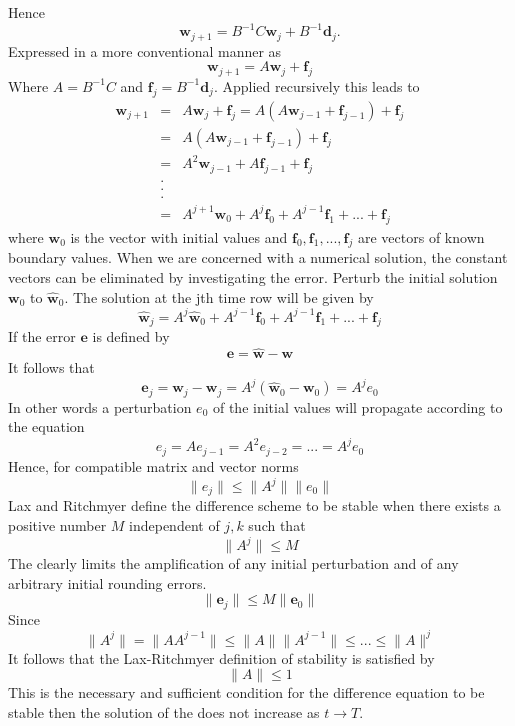 Hence
\[ \mathbf{w}_{j+1}=B^{-1}C\mathbf{w}_j+B^{-1}\mathbf{d}_j. \]
Expressed in a more conventional manner as
\[ \mathbf{w}_{j+1}=A\mathbf{w}_j+\mathbf{f}_j \]
Where $A=B^{-1}C$ and $\mathbf{f}_j =B^{-1}\mathbf{d}_j$.  Applied recursively this leads to
\begin{eqnarray*}
 \mathbf{w}_{j+1}&=&A\mathbf{w}_j+\mathbf{f}_j =A(A\mathbf{w}_{j-1}+\mathbf{f}_{j-1}) +\mathbf{f}_j \\
&=&A(A\mathbf{w}_{j-1}+\mathbf{f}_{j-1}) +\mathbf{f}_j \\
&=&A^2\mathbf{w}_{j-1}+A\mathbf{f}_{j-1} +\mathbf{f}_j \\
&.&\\
&.&\\
&.&\\
&=&A^{j+1}\mathbf{w}_0+A^j\mathbf{f}_0+A^{j-1}\mathbf{f}_1+...+\mathbf{f}_{j}
\end{eqnarray*}
where $\mathbf{w}_0$ is the vector with initial values and $\mathbf{f}_0,\mathbf{f}_1,...,\mathbf{f}_{j}$ are vectors of known boundary values.  When we are concerned with a numerical solution, the constant vectors can be eliminated by investigating the error.  Perturb the initial solution $\mathbf{w}_0$ to $\mathbf{\hat{w}}_0$.  The solution at the jth time row will be given by
\[\mathbf{\hat{w}}_j=A^{j}\mathbf{\hat{w}}_0+A^{j-1}\mathbf{f}_0+A^{j-1}\mathbf{f}_1+...+\mathbf{f}_{j}
\]
If the error $\mathbf{e}$ is defined by 
\[ \mathbf{e}=\mathbf{\hat{w}}-\mathbf{w}\]
It follows that 
\[ \mathbf{e}_j=\mathbf{\hat{w}}_j-\mathbf{w}_j=A^{j}(\mathbf{\hat{w}}_0-\mathbf{w}_0)=A^{j}e_0\]
In other words a perturbation $e_0$ of the initial values will propagate according to the equation 
\[e_j=Ae_{j-1}=A^2e_{j-2}=...=A^je_0 \]
Hence, for compatible matrix and vector norms
\[\lVert e_{j}\rVert \leq \lVert A^{j}\rVert \lVert e_0\rVert \]
Lax and Ritchmyer define the difference scheme to be stable when there exists a positive number $M$ independent of $j,k$ such that 
\[ \lVert A^{j}\rVert \leq M \]
The clearly limits the amplification of any initial perturbation and of any arbitrary initial rounding errors.
\[ \lVert \mathbf{e}_j\rVert \leq M\lVert \mathbf{e}_0\rVert  \]
Since
\[ \lVert A^j\rVert = \lVert AA^{j-1}\rVert \leq \lVert A\rVert \lVert A^{j-1}\rVert  \leq ... \leq \lVert A\rVert ^j \]
It follows that the Lax-Ritchmyer definition of stability is satisfied by
\[\lVert A\rVert  \leq 1\]
This is the necessary and sufficient condition for the difference equation to be
stable then the solution of the  does not increase as $t \rightarrow T$.\\
